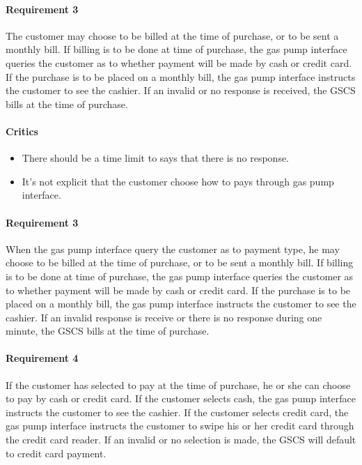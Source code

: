 \documentclass[11pt, a4paper]{article}
\begin{document}
\paragraph{Requirement 3} The customer may choose to be billed at the time
of purchase, or to be sent a monthly bill. If billing is to be done at time
of purchase, the gas pump interface queries the customer as to whether
payment will be made by cash or credit card. If the purchase is to be placed
on a monthly bill, the gas pump interface instructs the customer to see the
cashier. If an invalid or no response is received, the GSCS bills at the
time of purchase.

\begin{framed}
    \paragraph{Critics} 
    \begin{itemize}
        \item There should be a time limit to says that there is no
            response.
        \item It's not explicit that the customer choose how to pays
            through gas pump interface.
    \end{itemize}

    \paragraph{Requirement 3} When the gas pump interface query the
    customer as to payment type, he may choose to be billed at the
    time of purchase, or to be sent a monthly bill. 
    If billing is to be done at time of purchase, the gas pump
    interface queries the customer as to whether payment will be
    made by cash or credit card. If the purchase is to be placed on
    a monthly bill, the gas pump interface instructs the customer to
    see the cashier. If an invalid response is receive or there is
    no response during one minute, the GSCS bills at the time of purchase.
\end{framed}

\paragraph{Requirement 4} If the customer has selected to pay at the time of
purchase, he or she can choose to pay by cash or credit card. If the
customer selects cash, the gas pump interface instructs the customer to see
the cashier. If the customer selects credit card, the gas pump interface
instructs the customer to swipe his or her credit card through the credit
card reader. If an invalid or no selection is made, the GSCS will default
to credit card payment.
\end{document}
